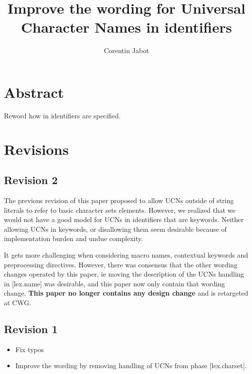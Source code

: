 \documentclass{wg21}
\title{Improve the wording for Universal Character Names in identifiers}
\author{Corentin Jabot}{corentin.jabot@gmail.com}
\begin{document}
\maketitle

\section{Abstract}

Reword how  in identifiers are specified.


\section{Revisions}

\subsection*{Revision 2}

The previous revision of this paper proposed to allow UCNs outside of string literals to refer to
basic character sets elements.
However, we realized that we would not have a good model for UCNs in identifiers that are keywords.
Neither allowing UCNs in keywords, or disallowing them seem desirable because of implementation burden and undue complexity.

It gets more challenging when considering macro names, contextual keywords and preprocessing directives.
However, there was consensus that the other wording changes operated by this paper, ie moving the description of the UCNs handling in [lex.name] was desirable, and this paper now only contain that wording change.
\textbf{This paper no longer contains any design change} and is retargeted at CWG.


\subsection*{Revision 1}
\begin{itemize}
  \item Fix typos
  \item Improve the wording by removing handling of UCNs from phase [lex.charset].
\end{itemize}
\end{document}
